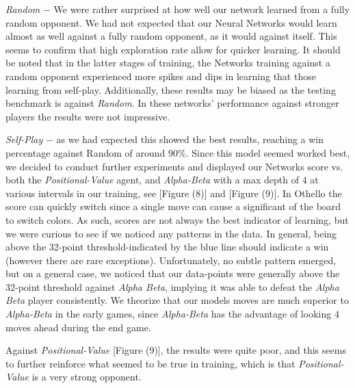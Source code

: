 \documentclass{sig-alternate-05-2015}
\begin{document}
\emph{Random} $-$ We were rather surprised at how well our network learned from a fully random opponent. We had not expected that our Neural Networks would learn almost as well against a fully random opponent, as it would against itself. This seems to confirm that high exploration rate allow for quicker learning. It should be noted that in the latter stages of training, the Networks training against a random opponent experienced more spikes and dips in learning that those learning from self-play. Additionally, these results may be biased as the testing benchmark is against \emph{Random}. In these networks' performance against stronger players the results were not impressive.

\emph{Self-Play} $-$ as we had expected this showed the best results, reaching a win percentage against Random of around $90\%$. Since this model seemed worked best, we decided to conduct  further experiments and displayed our Networks score vs. both the \emph{Positional-Value} agent, and \emph{Alpha-Beta}  with a max depth of $4$ at various intervals in our training, see [Figure (8)] and [Figure (9)]. In Othello the score can quickly switch since a single move can cause a significant of the board to switch colors. As such, scores are not always the best indicator of learning, but we were curious to see if we noticed any patterns in the data. In general, being above the 32-point threshold-indicated by the blue line should indicate a win (however there are rare exceptions). Unfortunately, no subtle pattern emerged, but on a general case, we noticed that our data-points were generally above the $32$-point threshold against \emph{Alpha Beta}, implying it was able to defeat the \emph{Alpha Beta} player consistently. We theorize that our models moves are much superior to \emph{Alpha-Beta} in the early games, since \emph{Alpha-Beta} has the advantage of looking $4$ moves ahead during the end game. 

	Against \emph{Positional-Value} [Figure (9)], the results were quite poor, and this seems to further reinforce what seemed to be true in training, which is that \emph{Positional-Value} is a very strong opponent.
\end{document}
